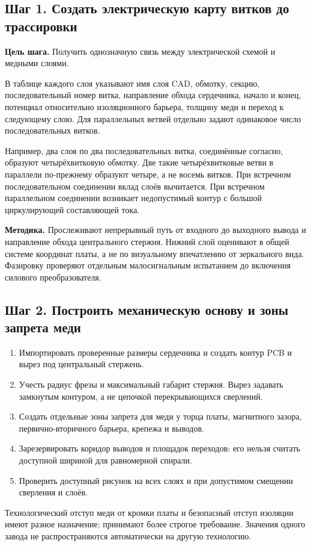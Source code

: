\documentclass[14pt,a4paper]{extarticle}
\newcommand{\method}{\par\noindent\textbf{Методика.} }
\newcommand{\stepgoal}[1]{\par\noindent\textbf{Цель шага.} #1\par}
\begin{document}
\subsection{Шаг 1. Создать электрическую карту витков до трассировки}
\stepgoal{Получить однозначную связь между электрической схемой и медными слоями.}
В таблице каждого слоя указывают имя слоя CAD, обмотку, секцию, последовательный номер витка, направление обхода сердечника, начало и конец, потенциал относительно изоляционного барьера, толщину меди и переход к следующему слою. Для параллельных ветвей отдельно задают одинаковое число последовательных витков.

Например, два слоя по два последовательных витка, соединённые согласно, образуют четырёхвитковую обмотку. Две такие четырёхвитковые ветви в параллели по-прежнему образуют четыре, а не восемь витков. При встречном последовательном соединении вклад слоёв вычитается. При встречном параллельном соединении возникает недопустимый контур с большой циркулирующей составляющей тока.

\method Прослеживают непрерывный путь от входного до выходного вывода и направление обхода центрального стержня. Нижний слой оценивают в общей системе координат платы, а не по визуальному впечатлению от зеркального вида. Фазировку проверяют отдельным малосигнальным испытанием до включения силового преобразователя.

\subsection{Шаг 2. Построить механическую основу и зоны запрета меди}
\begin{enumerate}
\item Импортировать проверенные размеры сердечника и создать контур PCB и вырез под центральный стержень.
\item Учесть радиус фрезы и максимальный габарит стержня. Вырез задавать замкнутым контуром, а не цепочкой перекрывающихся сверлений.
\item Создать отдельные зоны запрета для меди у торца платы, магнитного зазора, первично-вторичного барьера, крепежа и выводов.
\item Зарезервировать коридор выводов и площадок переходов: его нельзя считать доступной шириной для равномерной спирали.
\item Проверить доступный рисунок на всех слоях и при допустимом смещении сверления и слоёв.
\end{enumerate}
Технологический отступ меди от кромки платы и безопасный отступ изоляции имеют разное назначение; принимают более строгое требование. Значения одного завода не распространяются автоматически на другую технологию.\cite{web17,web18,web21}
\end{document}
